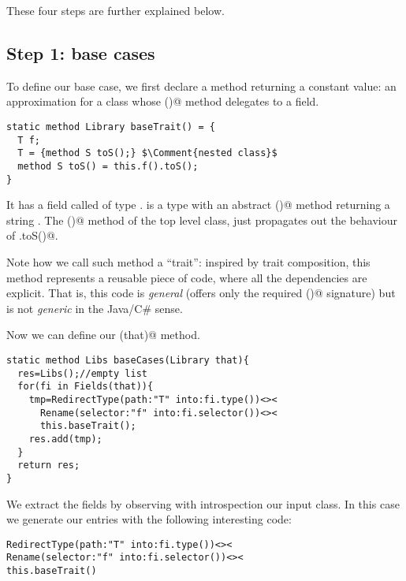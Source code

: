 
\noindent
These four steps are further explained below.

\saveSpace\saveSpace
\subsection*{Step 1: base cases}
To define our base case, we first 
 declare a method returning a constant \Q@Library@ value: an approximation for a class
 whose  \Q@toS()@ method delegates to a field.

\saveSpace
\begin{lstlisting}
static method Library baseTrait() = {
  T f;
  T = {method S toS();} $\Comment{nested class}$
  method S toS() = this.f().toS();
}
\end{lstlisting}
\saveSpace

It has a field called \Q@f@ of type \Q@T@.
\Q@T@ is a type with an abstract \Q@toS()@ method returning a string \Q@S@.
The \Q@toS()@ method of the top level class, just propagates out
the behaviour of \Q@T.toS()@.

Note how we call such method a ``trait'': inspired by trait composition, 
this method represents a reusable piece of code, where all the dependencies are explicit.
That is, this code is \emph{general} (\Q@T@ offers only the required \Q@toS()@ signature)
but is not \emph{generic} in the Java/C\# sense.

\noindent
Now we can define our \Q@baseCases(that)@ method.

\saveSpace
\begin{lstlisting}
static method Libs baseCases(Library that){
  res=Libs();//empty list
  for(fi in Fields(that)){
    tmp=RedirectType(path:"T" into:fi.type())<><
      Rename(selector:"f" into:fi.selector())<><
      this.baseTrait();
    res.add(tmp);
  }
  return res;
}
\end{lstlisting}
\saveSpace

\noindent
We extract the fields by observing with introspection
our input class.
In this case we generate our entries with the following interesting code:

\saveSpace
\begin{lstlisting}
RedirectType(path:"T" into:fi.type())<><
Rename(selector:"f" into:fi.selector())<><
this.baseTrait()
\end{lstlisting}
\saveSpace

